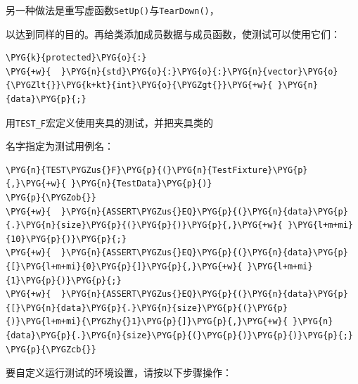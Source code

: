 
另一种做法是重写虚函数\texttt{SetUp()}与\texttt{TearDown()}，



以达到同样的目的。再给类添加成员数据与成员函数，使测试可以使用它们：



\begin{codeblockbg}
\begin{Verbatim}[commandchars=\\\{\},breaklines=true,breakanywhere=true,fontsize=\codefont,xleftmargin=17bp]
\PYG{k}{protected}\PYG{o}{:}
\PYG{+w}{  }\PYG{n}{std}\PYG{o}{:}\PYG{o}{:}\PYG{n}{vector}\PYG{o}{\PYGZlt{}}\PYG{k+kt}{int}\PYG{o}{\PYGZgt{}}\PYG{+w}{ }\PYG{n}{data}\PYG{p}{;}
\end{Verbatim}
\end{codeblockbg}



用\texttt{TEST\_\allowbreak{}F}宏定义使用夹具的测试，并把夹具类的



名字指定为测试用例名：



\begin{codeblockbg}
\begin{Verbatim}[commandchars=\\\{\},breaklines=true,breakanywhere=true,fontsize=\codefont,xleftmargin=17bp]
\PYG{n}{TEST\PYGZus{}F}\PYG{p}{(}\PYG{n}{TestFixture}\PYG{p}{,}\PYG{+w}{ }\PYG{n}{TestData}\PYG{p}{)}
\PYG{p}{\PYGZob{}}
\PYG{+w}{  }\PYG{n}{ASSERT\PYGZus{}EQ}\PYG{p}{(}\PYG{n}{data}\PYG{p}{.}\PYG{n}{size}\PYG{p}{(}\PYG{p}{)}\PYG{p}{,}\PYG{+w}{ }\PYG{l+m+mi}{10}\PYG{p}{)}\PYG{p}{;}
\PYG{+w}{  }\PYG{n}{ASSERT\PYGZus{}EQ}\PYG{p}{(}\PYG{n}{data}\PYG{p}{[}\PYG{l+m+mi}{0}\PYG{p}{]}\PYG{p}{,}\PYG{+w}{ }\PYG{l+m+mi}{1}\PYG{p}{)}\PYG{p}{;}
\PYG{+w}{  }\PYG{n}{ASSERT\PYGZus{}EQ}\PYG{p}{(}\PYG{n}{data}\PYG{p}{[}\PYG{n}{data}\PYG{p}{.}\PYG{n}{size}\PYG{p}{(}\PYG{p}{)}\PYG{l+m+mi}{\PYGZhy{}1}\PYG{p}{]}\PYG{p}{,}\PYG{+w}{ }\PYG{n}{data}\PYG{p}{.}\PYG{n}{size}\PYG{p}{(}\PYG{p}{)}\PYG{p}{)}\PYG{p}{;}
\PYG{p}{\PYGZcb{}}
\end{Verbatim}
\end{codeblockbg}



要自定义运行测试的环境设置，请按以下步骤操作：



